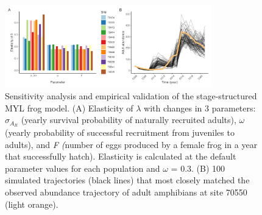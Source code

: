 \documentclass[9pt,twocolumn,twoside,lineno]{pnas-new}
\begin{document}
\begin{figure}

{\centering \includegraphics[width=0.8\textwidth]{figures/pop_viability_figures_for_supp1.jpg}

}

\caption{\label{fig-viability-supp}Sensitivity analysis and empirical
validation of the stage-structured MYL frog model. (A) Elasticity of
\(\lambda\) with changes in 3 parameters: \(\sigma_{A_R}\) (yearly
survival probability of naturally recruited adults), \(\omega\) (yearly
probability of successful recruitment from juveniles to adults), and
\emph{F (}number of eggs produced by a female frog in a year that
successfully hatch). Elasticity is calculated at the default parameter
values for each population and \(\omega\) = 0.3. (B) 100 simulated
trajectories (black lines) that most closely matched the observed
abundance trajectory of adult amphibians at site 70550 (light orange).}

\end{figure}
\end{document}
